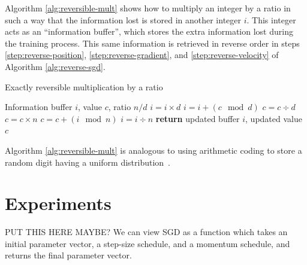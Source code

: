 \documentclass{article}
\newcommand{\decay}{\gamma}
\begin{document}
Algorithm \ref{alg:reversible-mult} shows how to multiply an integer by a ratio in such a way that the information lost is stored in another integer $i$.
This integer acts as an ``information buffer'', which stores the extra information lost during the training process.
This same information is retrieved in reverse order in steps \ref{step:reverse-position}, \ref{step:reverse-gradient}, and \ref{step:reverse-velocity} of Algorithm \ref{alg:reverse-sgd}.

%
\begin{algorithm}
   \caption{Exactly reversible multiplication by a ratio}
   \label{alg:reversible-mult}
\begin{algorithmic}[1]
    Information buffer $i$, value $c$, ratio $n / d$
   \State $i = i \times d$                \label{step:f1}
   \State $i = i + (c \! \mod d)$    \label{step:f2}
   \State $c = c \div d$                    \label{step:f3}
   \State $c = c \times n$                  \label{step:b1}
   \State $c = c +  (i \! \mod n)$          \label{step:b2}
   \State $i = i \div n$               \label{step:b3}
   \State \textbf{return} updated buffer $i$, updated value $c$
\end{algorithmic}
\end{algorithm}
%

%
%
Algorithm \ref{alg:reversible-mult} is analogous to using arithmetic coding to store a random digit having a uniform distribution~\citep{steinruecken2014a}.

\section{Experiments}
\label{sec:experiments}

PUT THIS HERE MAYBE?
We can view SGD as a function which takes an initial parameter vector, a step-size schedule, and a momentum schedule, and returns the final parameter vector.
\end{document}
